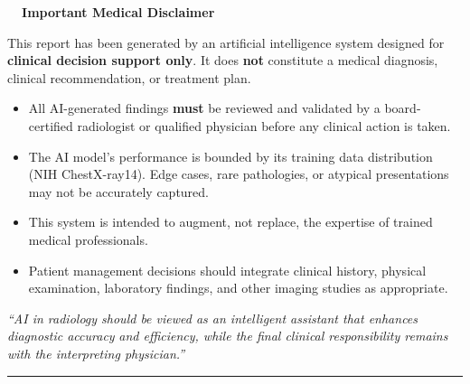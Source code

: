 \documentclass[11pt, a4paper]{article}
\begin{document}
\begin{disclaimerbox}
\begin{center}
\textbf{\color{riskModerate}\faExclamationTriangle\ \ Important Medical Disclaimer}
\end{center}

\vspace{0.3em}
\small
This report has been generated by an artificial intelligence system designed for \textbf{clinical decision
support only}. It does \textbf{not} constitute a medical diagnosis, clinical recommendation,
or treatment plan.

\vspace{0.3em}
\begin{itemize}[leftmargin=1.5em, itemsep=2pt]
	\item[\ding{110}] All AI-generated findings \textbf{must} be reviewed and validated by a board-certified radiologist
		or qualified physician before any clinical action is taken.
	\item[\ding{110}] The AI model's performance is bounded by its training data distribution (NIH ChestX-ray14).
		Edge cases, rare pathologies, or atypical presentations may not be accurately captured.
	\item[\ding{110}] This system is intended to augment, not replace, the expertise of trained medical professionals.
	\item[\ding{110}] Patient management decisions should integrate clinical history, physical examination,
		laboratory findings, and other imaging studies as appropriate.
\end{itemize}

\vspace{0.3em}
\begin{center}
\small\color{textSecondary}
\textit{``AI in radiology should be viewed as an intelligent assistant that enhances diagnostic accuracy}
\textit{and efficiency, while the final clinical responsibility remains with the interpreting physician.''}
\end{center}
\end{disclaimerbox}

\vspace{1em}

\begin{center}
\color{cardBorder}\rule{0.9\textwidth}{0.5pt}
\end{center}
\end{document}
